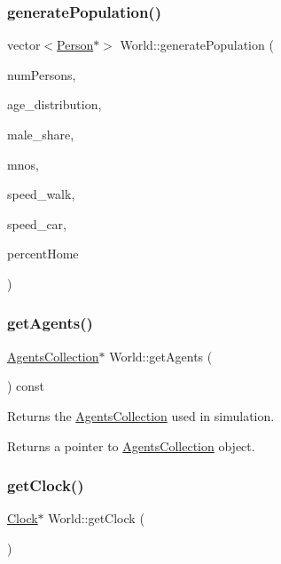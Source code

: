 \subsubsection{\texorpdfstring{generate\+Population()}{generatePopulation()}\hspace{0.1cm}{\footnotesize\ttfamily [2/2]}}
{\footnotesize\ttfamily vector$<$\hyperlink{class_person}{Person}$\ast$$>$ World\+::generate\+Population (\begin{DoxyParamCaption}\item[{const unsigned long}]{num\+Persons,  }\item[{shared\+\_\+ptr$<$ \hyperlink{class_age_distribution}{Age\+Distribution} $>$}]{age\+\_\+distribution,  }\item[{double}]{male\+\_\+share,  }\item[{vector$<$ \hyperlink{class_mobile_operator}{Mobile\+Operator} $\ast$$>$}]{mnos,  }\item[{double}]{speed\+\_\+walk,  }\item[{double}]{speed\+\_\+car,  }\item[{double}]{percent\+Home }\end{DoxyParamCaption})\hspace{0.3cm}{\ttfamily [private]}}

\mbox{\label{class_world_a8cf8a54ae1f3cb61efeba2b3acebb7cc}} 
\subsubsection{\texorpdfstring{get\+Agents()}{getAgents()}}
{\footnotesize\ttfamily \hyperlink{class_agents_collection}{Agents\+Collection}$\ast$ World\+::get\+Agents (\begin{DoxyParamCaption}{ }\end{DoxyParamCaption}) const}

Returns the \hyperlink{class_agents_collection}{Agents\+Collection} used in simulation. \begin{DoxyReturn}{Returns}
a pointer to \hyperlink{class_agents_collection}{Agents\+Collection} object. 
\end{DoxyReturn}
\mbox{\label{class_world_aa51e0799a58035305307e398a81ffeb2}} 
\subsubsection{\texorpdfstring{get\+Clock()}{getClock()}}
{\footnotesize\ttfamily \hyperlink{class_clock}{Clock}$\ast$ World\+::get\+Clock (\begin{DoxyParamCaption}{ }\end{DoxyParamCaption})}


